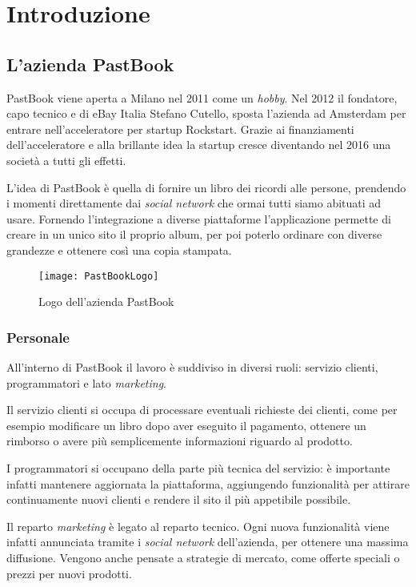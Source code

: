 \mainmatter

\chapter{Introduzione}

\section{L'azienda PastBook}
PastBook viene aperta a Milano nel 2011 come un \textit{hobby}. Nel 2012 il
fondatore, capo tecnico e  di eBay Italia
Stefano Cutello, sposta l'azienda ad Amsterdam per entrare nell'acceleratore
per \gls{startup} Rockstart. Grazie ai finanziamenti dell'acceleratore e alla
brillante idea la \gls{startup} cresce diventando nel 2016 una società a tutti
gli effetti.

L'idea di PastBook è quella di fornire un libro dei ricordi alle
persone, prendendo i momenti direttamente dai \textit{social network} che ormai
tutti siamo abituati ad usare. Fornendo l'integrazione a diverse piattaforme
l'applicazione permette di creare in un unico sito il proprio album, per poi
poterlo ordinare con diverse grandezze e ottenere così una copia stampata.

\begin{figure}[H]
  \centering
  \texttt{[image: PastBookLogo]}
  \caption{Logo dell'azienda PastBook}
\end{figure}


\subsection{Personale}

All'interno di PastBook il lavoro è suddiviso in diversi ruoli: servizio
clienti, programmatori e lato \textit{marketing}.

Il servizio clienti si occupa di processare eventuali richieste dei clienti,
come per esempio modificare un libro dopo aver eseguito il pagamento, ottenere
un rimborso o avere più semplicemente informazioni riguardo al prodotto.

I programmatori si occupano della parte più tecnica del servizio: è importante
infatti mantenere aggiornata la piattaforma, aggiungendo funzionalità
per attirare continuamente nuovi clienti e rendere il sito il più appetibile
possibile.

Il reparto \textit{marketing} è legato al reparto tecnico. Ogni nuova
funzionalità viene infatti annunciata tramite i \textit{social network}
dell'azienda, per ottenere una massima diffusione. Vengono anche pensate a
strategie di mercato, come offerte speciali o prezzi per nuovi prodotti.

